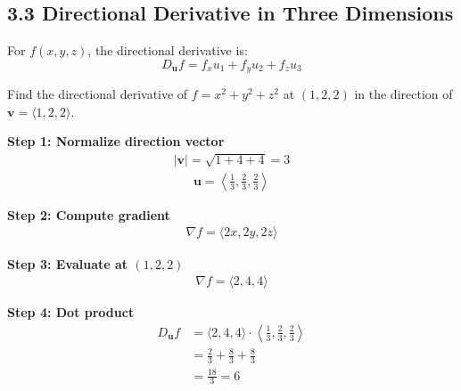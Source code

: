 \subsection*{3.3 Directional Derivative in Three Dimensions}

\begin{conceptbox}
    For $f(x,y,z)$, the directional derivative is:
    \begin{equation*}
        D_{\mathbf{u}} f = f_x u_1 + f_y u_2 + f_z u_3
    \end{equation*}
\end{conceptbox}

\begin{examplebox}
    Find the directional derivative of $f=x^2+y^2+z^2$ at $(1,2,2)$ in the direction of $\mathbf{v}=\langle1,2,2\rangle$.

    \textbf{Step 1: Normalize direction vector}
    \begin{align*}
        |\mathbf{v}| = \sqrt{1+4+4} = 3
    \end{align*}
    \begin{align*}
        \mathbf{u} = \left\langle \frac{1}{3}, \frac{2}{3}, \frac{2}{3} \right\rangle
    \end{align*}

    \textbf{Step 2: Compute gradient}
    \begin{align*}
        \nabla f = \langle 2x,2y,2z \rangle
    \end{align*}

    \textbf{Step 3: Evaluate at $(1,2,2)$}
    \begin{align*}
        \nabla f = \langle2,4,4\rangle
    \end{align*}

    \textbf{Step 4: Dot product}
    \begin{align*}
        D_{\mathbf{u}} f & = \langle2,4,4\rangle \cdot \left\langle \frac{1}{3}, \frac{2}{3}, \frac{2}{3} \right\rangle \\
                         & = \frac{2}{3} + \frac{8}{3} + \frac{8}{3}                                                    \\
                         & = \frac{18}{3} = 6
    \end{align*}
\end{examplebox}
